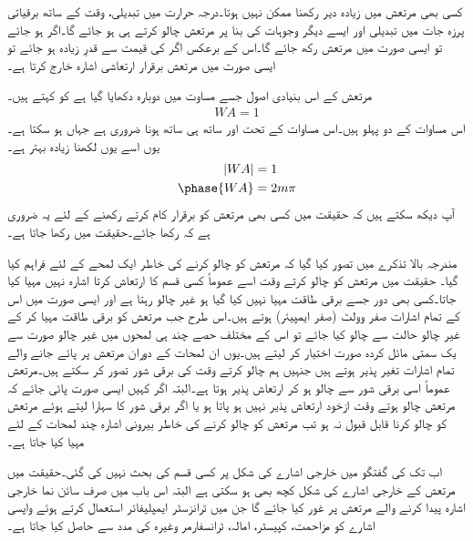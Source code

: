 کسی بھی مرتعش میں زیادہ دیر   رکھنا ممکن نہیں ہوتا۔درجہ حرارت میں تبدیلی، وقت کے ساتھ برقیاتی پرزہ جات میں تبدیلی اور ایسے دیگر  وجوہات کی بنا پر مرتعش چالو کرتے ہی  ہو جائے گا۔اگر   ہو جائے تو ایسی صورت میں مرتعش رکھ جائے گا۔اس کے برعکس اگر  کی قیمت   سے قدرِ زیادہ ہو جائے تو ایسی صورت میں مرتعش برقرار ارتعاشی اشارہ خارج کرتا ہے۔

مرتعش کے اس بنیادی اصول جسے مساوت  میں دوبارہ دکھایا گیا ہے کو  کہتے ہیں۔
\begin{align} \label{مساوات_برکہازن_کا_اصول}
WA =1
\end{align}
اس مساوات کے دو پہلو ہیں۔اس مساوات کے تحت  اور ساتھ ہی ساتھ  ہونا ضروری ہے جہاں   ہو سکتا ہے۔یوں اسے یوں لکھنا زیادہ بہتر ہے۔
\begin{align} \label{مساوات_برکہازن_کا_اصول_الف}
\abs{WA} &=\num{1}\\
\phase{WA} &=2m \pi 
\end{align}
آپ دیکھ سکتے ہیں کہ حقیقت میں کسی بھی مرتعش کو برقرار کام کرتے رکھنے کے لئے یہ ضروری ہے کہ   رکھا جائے۔حقیقت میں
  رکھا جاتا ہے۔
 
مندرجہ بالا تذکرے میں تصور کیا گیا کہ مرتعش کو چالو کرنے کی خاطر ایک لمحے کے لئے  فراہم کیا گیا۔ حقیقت میں مرتعش کو چالو کرتے وقت اسے عموماً کسی قسم کا ارتعاش کرتا اشارہ نہیں مہیا کیا جاتا۔کسی بھی دور جسے برقی طاقت مہیا نہیں کیا گیا ہو غیر چالو رہتا ہے اور ایسی صورت  میں اس کے تمام اشارات صفر وولٹ (صفر ایمپیئر) ہوتے ہیں۔اس طرح جب مرتعش کو برقی طاقت مہیا کر کے غیر چالو حالت سے چالو کیا جائے تو اس کے مختلف حصے چند ہی لمحوں میں غیر چالو صورت سے یک سمتی  مائل کردہ  صورت اختیار کر لیتے ہیں۔یوں ان لمحات کے دوران مرتعش پر پائے جانے والے تمام اشارات تغیر پذیر ہوتے ہیں جنہیں ہم چالو کرتے وقت کی برقی شور تصور کر سکتے ہیں۔مرتعش عموماً اسی برقی شور سے چالو ہو کر ارتعاش پذیر ہوتا ہے۔البتہ اگر کہیں ایسی صورت پائی جائے کہ مرتعش چالو ہوتے وقت ازخود ارتعاش پذیر نہیں ہو پاتا ہو یا اگر برقی شور کا سہارا لیتے ہوئے مرتعش کو چالو کرنا قابل قبول نہ ہو تب مرتعش کو چالو کرنے کی خاطر بیرونی اشارہ چند لمحات کے لئے مہیا کیا جاتا ہے۔ 

اب تک کی گفتگو میں خارجی اشارے کی شکل پر کسی قسم کی بحث نہیں کی گئی۔حقیقت میں مرتعش کے خارجی اشارے کی شکل کچھ بھی ہو سکتی ہے البتہ اس باب میں صرف سائن نما خارجی اشارہ پیدا کرنے والے مرتعش پر غور کیا جائے گا جن میں ٹرانزسٹر ایمپلیفائر  استعمال کرتے ہوئے واپسی اشارے کو مزاحمت، کپیسٹر، امالہ، ٹرانسفارمر وغیرہ کی مدد سے حاصل کیا جاتا ہے۔


